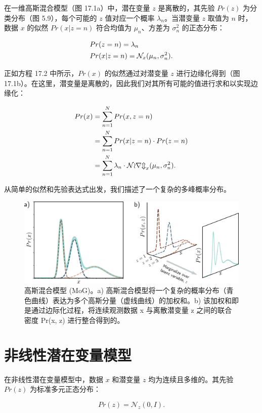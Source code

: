 在一维高斯混合模型（图 17.1a）中，潜在变量 \(z\) 是离散的，其先验 \(Pr(z)\) 为分类分布（图 5.9），每个可能的 \(z\) 值对应一个概率 \(\lambda_n\)。当潜变量 \(z\) 取值为 \(n\) 时，数据 \(x\) 的似然 \(Pr(x|z = n)\) 符合均值为 \(\mu_n\)、方差为 \(\sigma^2_n\) 的正态分布：


\begin{align}
&Pr(z = n) = \lambda_n \notag \\
&Pr(x|z = n) = \mathcal{N}_{x}(\mu_n, \sigma^2_n). 
\end{align} 


正如方程 17.2 中所示，\(Pr(x)\) 的似然通过对潜变量 \(z\) 进行边缘化得到（图 17.1b）。在这里，潜变量是离散的，因此我们对其所有可能的值进行求和以实现边缘化：


\begin{align}
Pr(x) &= \sum_{n=1}^{N} Pr(x, z = n) \notag \\
&= \sum_{n=1}^{N} Pr(x|z = n) \cdot Pr(z = n) \notag \\
&= \sum_{n=1}^{N} \lambda_n \cdot \mathcal{Norm}_x(\mu_n, \sigma^2_n). 
\end{align} 


从简单的似然和先验表达式出发，我们描述了一个复杂的多峰概率分布。

\begin{figure}[ht!]
\centering
\includegraphics[width=0.7\linewidth]{png/chapter17/VAEMixGauss.png}
\caption{高斯混合模型 (MoG)。a) 高斯混合模型将一个复杂的概率分布（青色曲线）表达为多个高斯分量（虚线曲线）的加权和。b) 该加权和即是通过边际化过程，将连续观测数据 x 与离散潜变量 z 之间的联合密度 Pr(x, z) 进行整合得到的。}
\end{figure}


\section{非线性潜在变量模型}

在非线性潜在变量模型中，数据 \(x\) 和潜变量 \(z\) 均为连续且多维的。其先验 \(Pr(z)\) 为标准多元正态分布：

\begin{equation}
Pr(z) = \mathcal{N}_z(0, I). 
\end{equation}

